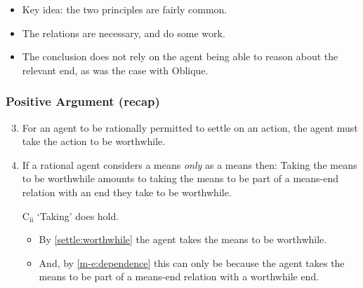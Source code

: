 \documentclass[noamssymb, compress, handout]{beamer} %
\begin{document}
\begin{frame}
  \begin{itemize}
  \item Key idea: the two principles are fairly common.
  \item The relations are necessary, and do some work.
  \item The conclusion does not rely on the agent being able to reason about the relevant end, as was the case with Oblique.
  \end{itemize}
\end{frame}

\begin{frame}
  \frametitle{Positive Argument (recap)}

  \begin{enumerate}
    \setcounter{enumi}{2}
  \item\label{settle:worthwhile} For an agent to be rationally permitted to settle on an action, the agent must take the action to be worthwhile.
  \item\label{m-e:dependence} If a rational agent considers a means \emph{only} as a means then: \newline Taking the means to be worthwhile amounts to taking the means to be part of a means-end relation with an end they take to be worthwhile.
    \item[C\(_{\text{ii}}\)] `Taking' does hold.
    \begin{itemize}
    \item By \ref{settle:worthwhile} the agent takes the means to be worthwhile.
    \item And, by \ref{m-e:dependence} this can only be because the agent takes the means to be part of a means-end relation with a worthwhile end.
    \end{itemize}
  \end{enumerate}


\end{frame}
\end{document}
